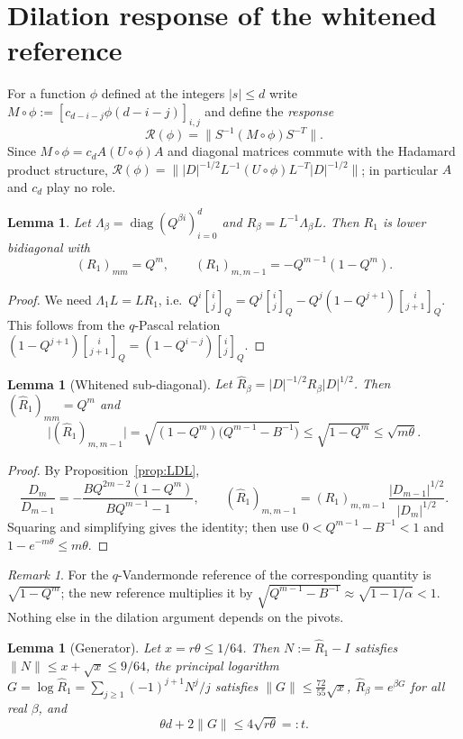 \documentclass[11pt,a4paper]{article}
\numberwithin{equation}{section}
\newtheorem{lemma}[theorem]{Lemma}
\theoremstyle{definition}
\theoremstyle{remark}
\newtheorem{remark}[theorem]{Remark}
\newcommand{\cR}{\mathcal R}
\newcommand{\qbin}[3]{\genfrac{[}{]}{0pt}{}{#1}{#2}_{#3}}
\DeclareMathOperator{\diag}{diag}
\begin{document}
\section{Dilation response of the whitened reference}\label{sec:gateB}

For a function $\phi$ defined at the integers $|s|\le d$ write $M\circ\phi:=[c_{d-i-j}\phi(d-i-j)]_{i,j}$ and define the
\emph{response}
\[
\cR(\phi)=\big\|S^{-1}(M\circ\phi)S^{-T}\big\| .
\]
Since $M\circ\phi=c_dA(U\circ\phi)A$ and diagonal matrices commute with the Hadamard product structure,
$\cR(\phi)=\||D|^{-1/2}L^{-1}(U\circ\phi)L^{-T}|D|^{-1/2}\|$; in particular $A$ and $c_d$ play no role.

\begin{lemma}\label{lem:R1}
Let $\Lambda_\beta=\diag(Q^{\beta i})_{i=0}^d$ and $R_\beta=L^{-1}\Lambda_\beta L$. Then $R_1$ is lower bidiagonal with
\[
(R_1)_{mm}=Q^m,\qquad (R_1)_{m,m-1}=-Q^{m-1}(1-Q^m).
\]
\end{lemma}

\begin{proof}
We need $\Lambda_1L=LR_1$, i.e.\ $Q^i\qbin ij{Q}=Q^j\qbin ij{Q}-Q^j(1-Q^{j+1})\qbin i{j+1}{Q}$. This follows from the
$q$-Pascal relation $(1-Q^{j+1})\qbin i{j+1}{Q}=(1-Q^{i-j})\qbin ij{Q}$.
\end{proof}

\begin{lemma}[Whitened sub-diagonal]\label{lem:subdiag}
Let $\widehat R_\beta=|D|^{-1/2}R_\beta|D|^{1/2}$. Then $(\widehat R_1)_{mm}=Q^m$ and
\[
\big|(\widehat R_1)_{m,m-1}\big|=\sqrt{(1-Q^m)\big(Q^{m-1}-B^{-1}\big)}\le\sqrt{1-Q^m}\le\sqrt{m\theta}.
\]
\end{lemma}

\begin{proof}
By Proposition~\ref{prop:LDL},
\[
\frac{D_m}{D_{m-1}}=-\frac{BQ^{2m-2}(1-Q^m)}{BQ^{m-1}-1},\qquad
(\widehat R_1)_{m,m-1}=(R_1)_{m,m-1}\,\frac{|D_{m-1}|^{1/2}}{|D_m|^{1/2}}.
\]
Squaring and simplifying gives the identity; then use
$0<Q^{m-1}-B^{-1}<1$ and $1-e^{-m\theta}\le m\theta$.
\end{proof}

\begin{remark}
For the $q$-Vandermonde reference of \cite{Mich} the corresponding quantity is $\sqrt{1-Q^m}$; the new reference
multiplies it by $\sqrt{Q^{m-1}-B^{-1}}\approx\sqrt{1-1/\alpha}<1$. Nothing else in the dilation argument depends on the
pivots.
\end{remark}

\begin{lemma}[Generator]\label{lem:generator}
Let $x=r\theta\le1/64$. Then $N:=\widehat R_1-I$ satisfies $\|N\|\le x+\sqrt x\le 9/64$, the principal logarithm
$G=\log\widehat R_1=\sum_{j\ge1}(-1)^{j+1}N^j/j$ satisfies $\|G\|\le\frac{72}{55}\sqrt x$, $\widehat R_\beta=e^{\beta G}$
for all real $\beta$, and
\[
\theta d+2\|G\|\le4\sqrt{r\theta}=:t .
\]
\end{lemma}
\end{document}
